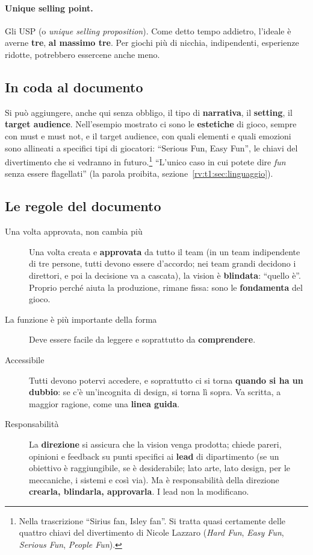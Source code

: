 \paragraph{Unique selling point.} Gli USP (o \emph{unique selling
proposition}). Come detto tempo addietro, l'ideale è averne \textbf{tre},
\textbf{al massimo tre}. Per giochi più di nicchia, indipendenti, esperienze
ridotte, potrebbero essercene anche meno.

\subsection{In coda al documento}

Si può aggiungere, anche qui senza obbligo, il tipo di \textbf{narrativa}, il
\textbf{setting}, il \textbf{target audience}. Nell'esempio mostrato ci sono
le \textbf{estetiche} di gioco, sempre con must e must not, e il target
audience, con quali elementi e quali emozioni sono allineati a specifici tipi
di giocatori: ``Serious Fun, Easy Fun'', le chiavi del divertimento che si
vedranno in futuro.\footnote{Nella trascrizione ``Sirius fan, Isley fan''.
Si tratta quasi certamente delle quattro chiavi del divertimento di Nicole
Lazzaro (\emph{Hard Fun}, \emph{Easy Fun}, \emph{Serious Fun}, \emph{People
Fun}).} ``L'unico caso in cui potete dire \emph{fun} senza essere
flagellati'' (la parola proibita, sezione~\ref{rv:t1:sec:linguaggio}).

\subsection{Le regole del documento}

\begin{description}
  \item[Una volta approvata, non cambia più] Una volta creata e
        \textbf{approvata} da tutto il team (in un team indipendente di tre
        persone, tutti devono essere d'accordo; nei team grandi decidono i
        direttori, e poi la decisione va a cascata), la vision è
        \textbf{blindata}: ``quello è''. Proprio perché aiuta la produzione,
        rimane fissa: sono le \textbf{fondamenta} del gioco.
  \item[La funzione è più importante della forma] Deve essere facile da
        leggere e soprattutto da \textbf{comprendere}.
  \item[Accessibile] Tutti devono potervi accedere, e soprattutto ci si
        torna \textbf{quando si ha un dubbio}: se c'è un'incognita di
        design, si torna lì sopra. Va scritta, a maggior ragione, come una
        \textbf{linea guida}.
  \item[Responsabilità] La \textbf{direzione} si assicura che la vision
        venga prodotta; chiede pareri, opinioni e feedback su punti
        specifici ai \textbf{lead} di dipartimento (se un obiettivo è
        raggiungibile, se è desiderabile; lato arte, lato design, per le
        meccaniche, i sistemi e così via). Ma è responsabilità della
        direzione \textbf{crearla, blindarla, approvarla}. I lead non la
        modificano.
\end{description}


